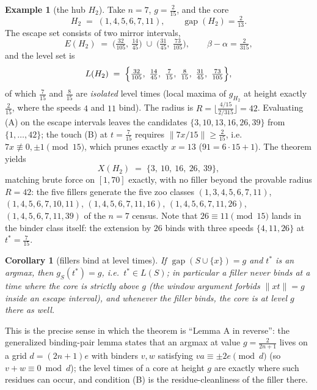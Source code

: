 \documentclass[11pt,a4paper]{article}
\theoremstyle{plain}
\newtheorem{corollary}[theorem]{Corollary}
\theoremstyle{definition}
\newtheorem{example}[theorem]{Example}
\theoremstyle{remark}
\newcommand{\norm}[1]{\lVert #1 \rVert}
\newcommand{\gap}{\operatorname{gap}}
\begin{document}
\begin{example}[the hub $H_2$]\label{ex:H2}
Take $n = 7$, $g = \tfrac{2}{15}$, and the core
\[
  H_2 \;=\; (1, 4, 5, 6, 7, 11),
  \qquad \gap(H_2) = \tfrac{2}{13}.
\]
The escape set consists of two mirror intervals,
\[
  E(H_2) \;=\; \bigl(\tfrac{32}{105},\ \tfrac{14}{45}\bigr)
  \;\cup\;
  \bigl(\tfrac{31}{45},\ \tfrac{73}{105}\bigr),
  \qquad \beta - \alpha = \tfrac{2}{315},
\]
and the level set is
\[
  L(H_2) \;=\; \Bigl\{ \tfrac{32}{105},\ \tfrac{14}{45},\ \tfrac{7}{15},\
  \tfrac{8}{15},\ \tfrac{31}{45},\ \tfrac{73}{105} \Bigr\},
\]
of which $\tfrac{7}{15}$ and $\tfrac{8}{15}$ are \emph{isolated} level times
(local maxima of $g_{H_2}$ at height exactly $\tfrac{2}{15}$, where the
speeds $4$ and $11$ bind). The radius is $R = \bigl\lfloor
\tfrac{4/15}{2/315} \bigr\rfloor = 42$. Evaluating (A) on the escape
intervals leaves the candidates $\{3, 10, 13, 16, 26, 39\}$ from
$\{1, \dots, 42\}$; the touch (B) at $t = \tfrac{7}{15}$ requires
$\norm{7x/15} \ge \tfrac{2}{15}$, i.e.\ $7x \not\equiv 0, \pm 1 \pmod{15}$,
which prunes exactly $x = 13$ ($91 = 6 \cdot 15 + 1$). The theorem yields
\[
  X(H_2) \;=\; \{3,\ 10,\ 16,\ 26,\ 39\},
\]
matching brute force on $[1, 70]$ exactly, with no filler beyond the
provable radius $R = 42$: the five fillers generate the five zoo classes
$(1,3,4,5,6,7,11)$, $(1,4,5,6,7,10,11)$, $(1,4,5,6,7,11,16)$,
$(1,4,5,6,7,11,26)$, $(1,4,5,6,7,11,39)$ of the $n = 7$ census. Note that
$26 \equiv 11 \pmod{15}$ lands in the binder class itself: the extension by
$26$ binds with three speeds $\{4, 11, 26\}$ at $t^\ast = \tfrac{7}{15}$.
\end{example}

\begin{corollary}[fillers bind at level times]\label{cor:bindlevel}
If $\gap(S \cup \{x\}) = g$ and $t^\ast$ is an argmax, then $g_S(t^\ast) =
g$, i.e.\ $t^\ast \in L(S)$; in particular a filler never binds at a time
where the core is strictly above $g$ (the window argument forbids $\norm{x
 t} = g$ inside an escape interval), and whenever the filler binds, the core
is at level $g$ there as well.
\end{corollary}

This is the precise sense in which the theorem is ``Lemma A in reverse'':
the generalized binding-pair lemma states that an argmax at value $g =
\tfrac{2}{2n+1}$ lives on a grid $d = (2n+1)e$ with binders $v, w$ satisfying
$va \equiv \pm 2e \pmod d$ (so $v + w \equiv 0 \bmod d$); the level times of
a core at height $g$ are exactly where such residues can occur, and
condition (B) is the residue-cleanliness of the filler there.
\end{document}
